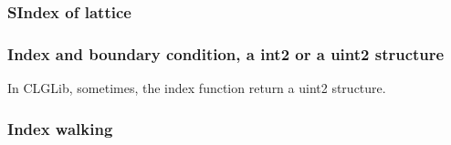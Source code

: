 \subsubsection{\label{sindex}SIndex of lattice}

\subsubsection{\label{index}Index and boundary condition, a int2 or a uint2 structure}

In CLGLib, sometimes, the index function return a uint2 structure.


\subsubsection{\label{index}Index walking}

